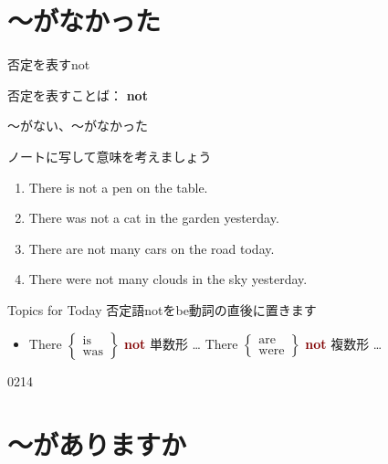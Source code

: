 \documentclass[aspectratio=169,xcolor={dvipsnames,table}]{beamer}
\newcommand{\myaudio}[1]{\href{#1}{\faVolumeUp}}
\begin{document}
\section{～がなかった}
\begin{frame}[plain]{否定を表すnot}
 \Large

否定を表すことば： {\LARGE\bfseries not}\hspace{20pt}
\end{frame}
\begin{frame}[plain]{〜がない、～がなかった}

ノートに写して意味を考えましょう

\begin{enumerate}
 \item There is not a pen on the table.
 \item There was not a cat in the garden yesterday.
 \item There are not many cars on the road today.
 \item There were not many clouds in the sky yesterday.
\end{enumerate}


\begin{block}{Topics for Today}
否定語notをbe動詞の直後に置きます
\begin{itemize}[square]
 \item There $\left\{\begin{array}{l}\text{is}\\\text{was}\end{array}
\right\}$ \textcolor{Maroon}{\bfseries not} 単数形 \ldots\hspace{40pt}
There $\left\{\begin{array}{l}\text{are}\\\text{were}\end{array}
\right\}$ \textcolor{Maroon}{\bfseries not} 複数形 \ldots
\end{itemize}
\end{block}

\hfill{\tiny 0214}\,{\scriptsize \myaudio{./audio/001_there_is_05.mp3}}
\end{frame}
\section{～がありますか}
\end{document}
